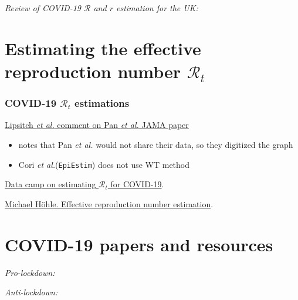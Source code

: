 \documentclass[12pt]{article}
\newcommand{\R}{{\mathcal R}}
\newcommand{\etal}{\emph{et al.}\/\xspace}
\begin{document}
\emph{Review of COVID-19 $\R$ and $r$ estimation for the UK:}\\

\section*{Estimating the effective reproduction number $\R_t$}




\subsubsection*{COVID-19 $\R_t$ estimations}


\href{https://github.com/keyajoshi/Pan_response}{Lipsitch \etal
  comment on Pan \etal JAMA paper}
{\footnotesize\parskip=0pt
\begin{itemize}\itemsep0pt
\item notes that Pan \etal would not share their data, so they digitized the graph
\item Cori \etal (\texttt{EpiEstim}) does not use WT method
\end{itemize}
}

\href{https://www.datacamp.com/community/tutorials/replicating-in-r-covid19}{Data camp on estimating $\R_t$ for COVID-19}.

\href{https://staff.math.su.se/hoehle/blog/2020/04/15/effectiveR0.html}{Michael Höhle.  Effective reproduction number estimation}.

\section*{COVID-19 papers and resources}








\emph{Pro-lockdown:}\\

\emph{Anti-lockdown:}\\
\end{document}
